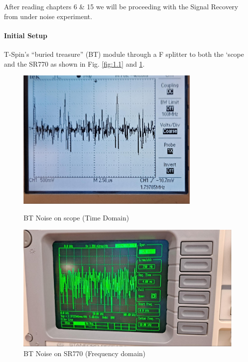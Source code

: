 \documentclass[../main.tex]{subfiles}
\begin{document}
After reading chapters 6 \& 15 we will be proceeding with the Signal Recovery from under noise experiment.

\paragraph*{Initial Setup}

T-Spin's ``buried treasure'' (BT) module through a F splitter to both the ‘scope and the SR770 as shown in Fig. \ref{fig:1.1} and \ref{fig:1.2}.

\begin{figure}[ht]
    \centering
    \begin{minipage}{0.5\textwidth}
        \centering
        \includegraphics[width=0.8\textwidth]{fig1_1a.jpg}
        \caption{BT Noise on scope (Time Domain)}
        \label{fig:1.1}
    \end{minipage}\hfill
    \begin{minipage}{0.5\textwidth}
        \centering
        \includegraphics[width=\textwidth]{fig1_1b.jpg}
        \caption{BT Noise on SR770 (Frequency domain)}
        \label{fig:1.2}
    \end{minipage}
\end{figure}
\end{document}
